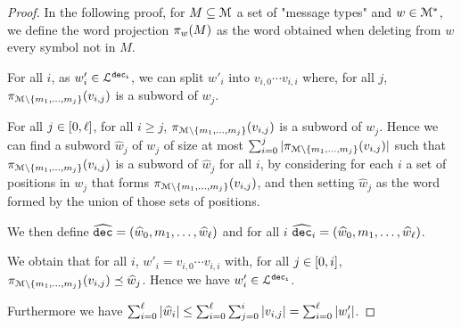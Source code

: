 \begin{proof}
	In the following proof, for $M \subseteq \messages$ a set of "message types" and $w \in \messages^*$, we define the word projection $\wordproj{M}{w}$ as the word obtained when deleting from $w$ every symbol not in $M$.

	For all $i$, as $w'_i \in \langdec{\decsymb_i}$, we can split $w'_i$ into $v_{i,0} \cdots v_{i,i}$ where, for all $j$, $\wordproj{v_{i,j}}{\messages\setminus\set{m_1, \ldots, m_{j}}}$ is a subword of $w_j$. 
	
	For all $j \in \nset{0}{\ell}$, for all $i\geq j$, $\wordproj{v_{i,j}}{\messages\setminus\set{m_1, \ldots, m_{j}}}$ is a subword of $w_j$.
	Hence we can find a subword $\widehat{w}_j$ of $w_j$ of size at most $\sum_{i=0}^{j} \size{\wordproj{v_{i,j}}{\messages\setminus\set{m_1, \ldots, m_{j}}}}$ such that $\wordproj{v_{i,j}}{\messages\setminus\set{m_1, \ldots, m_{j}}}$ is a subword of $\widehat{w}_j$ for all $i$, by considering for each $i$ a set of positions in $w_j$ that forms $\wordproj{v_{i,j}}{\messages\setminus\set{m_1, \ldots, m_{j}}}$, and then setting $\widehat{w}_j$ as the word formed by the union of those sets of positions.
	
	We then define $\widehat{\decsymb} = (\widehat{w}_0, m_1, \ldots, \widehat{w}_\ell)$ and for all $i$ $\widehat{\decsymb}_i = (\widehat{w}_0, m_1, \ldots, \widehat{w}_\ell)$.
	
	We obtain that for all $i$, $w'_i = v_{i,0} \cdots v_{i,i}$ with, for all $j \in \nset{0}{i}$, $\wordproj{v_{i,j}}{\messages\setminus\set{m_1, \ldots, m_j}} \subword \widehat{w}_j$. Hence we have $w'_i \in \langdec{\decsymb_i}$.
	
	Furthermore we have $\sum_{i=0}^{\ell} \size{\widehat{w}_i} \leq \sum_{i=0}^{\ell} \sum_{j=0}^i \size{v_{i,j}} = \sum_{i=0}^{\ell} \size{w'_i}$.
\end{proof}


